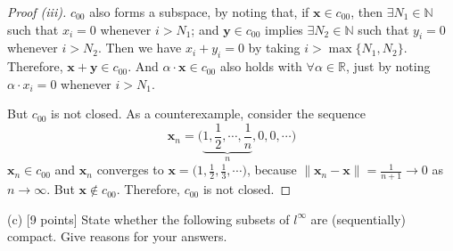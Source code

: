 \documentclass[11pt,a4paper]{amsart}
\def\R{{\mathbb R}}
\def\N{{\mathbb N}}
\def\a{\alpha}
\begin{document}
\begin{proof}[Proof (iii)]
$c_{00}$ also forms a subspace, by noting that, if $\bm x \in c_{00}$,
then $\exists N_1\in\N$ such that $x_i=0$ whenever $i>N_1$; and
$\bm y \in c_{00}$ implies $\exists N_2\in\N$ such that $y_i=0$ whenever $i>N_2$.
Then we have $x_i + y_i = 0$ by taking $i> \max\{N_1, N_2\}$.
Therefore, $\bm x + \bm y \in c_{00}$.
And $\a \cdot \bm x\in c_{00}$ also holds with $\forall\a\in\R$,
just by noting $\a\cdot x_i = 0$ whenever $i > N_1$.

But $c_{00}$ is not closed. As a counterexample, consider the sequence
$$ \bm x_n = \Big( \underbrace{1,\frac{1}{2}, \cdots, \frac{1}{n}}_{n},0,0,\cdots \Big)$$
$\bm x_n \in c_{00}$ and $\bm x_n$ converges to $\bm x = \Big(1,\frac{1}{2}, \frac{1}{3}, \cdots \Big)$,
because $\| \bm x_n - \bm x \| = \frac{1}{n+1} \to 0$ as $n\to\infty$.
But $\bm x\notin c_{00}$. Therefore, $c_{00}$ is not closed.
\end{proof}
\medskip

(c) [9 points] State whether the following subsets of $l^\infty$ are (sequentially) compact.
Give reasons for your answers.
\end{document}
